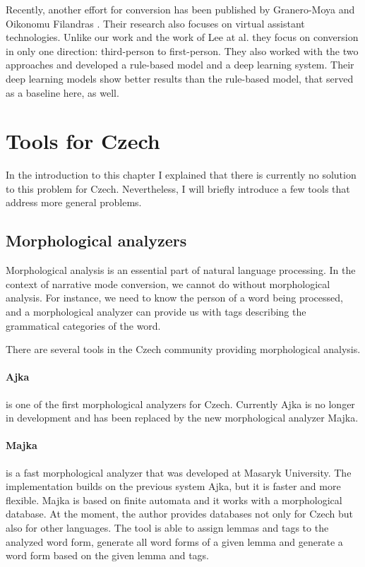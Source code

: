Recently, another effort for conversion has been published by Granero-Moya and Oikonomu Filandras \cite{granero-moya-oikonomou-filandras-2021-taking}. Their research also focuses on virtual assistant technologies. Unlike our work and the work of Lee at al. they focus on conversion in only one direction: third-person to first-person. They also worked with the two approaches and developed a rule-based model and a deep learning system. Their deep learning models show better results than the rule-based model, that served as a baseline here, as well.

\section{Tools for Czech}

In the introduction to this chapter I explained that there is currently no solution to this problem for Czech. Nevertheless, I will briefly introduce a few tools that address more general problems.

\subsection{Morphological analyzers}

Morphological analysis is an essential part of natural language processing. In the context of narrative mode conversion, we cannot do without morphological analysis. For instance, we need to know the person of a word being processed, and a morphological analyzer can provide us with tags describing the grammatical categories of the word.

There are several tools in the Czech community providing morphological analysis.

\paragraph{Ajka}

is one of the first morphological analyzers for Czech. Currently Ajka is no longer in development and has been replaced by the new morphological analyzer Majka. \cite{Sedlacekthesis}

\paragraph{Majka}

is a fast morphological analyzer that was developed at Masaryk University. The implementation builds on the previous system Ajka, but it is faster and more flexible. Majka is based on finite automata and it works with a morphological database. At the moment, the author provides databases not only for Czech but also for other languages. The tool is able to assign lemmas and tags to the analyzed word form, generate all word forms of a given lemma and generate a word form based on the given lemma and tags. \cite{majka}

